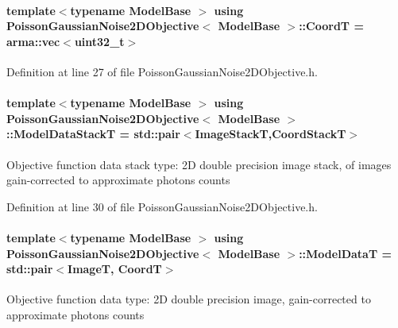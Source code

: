 \paragraph[{\texorpdfstring{CoordT}{CoordT}}]{\setlength{\rightskip}{0pt plus 5cm}template$<$typename Model\+Base $>$ using {\bf Poisson\+Gaussian\+Noise2\+D\+Objective}$<$ Model\+Base $>$\+::{\bf CoordT} =  arma\+::vec$<$uint32\+\_\+t$>$}\hypertarget{classPoissonGaussianNoise2DObjective_a4869a86fc5712492b479c26b4d808e38}{}\label{classPoissonGaussianNoise2DObjective_a4869a86fc5712492b479c26b4d808e38}


Definition at line 27 of file Poisson\+Gaussian\+Noise2\+D\+Objective.\+h.

\paragraph[{\texorpdfstring{Model\+Data\+StackT}{ModelDataStackT}}]{\setlength{\rightskip}{0pt plus 5cm}template$<$typename Model\+Base $>$ using {\bf Poisson\+Gaussian\+Noise2\+D\+Objective}$<$ Model\+Base $>$\+::{\bf Model\+Data\+StackT} =  std\+::pair$<$Image\+StackT,{\bf Coord\+StackT}$>$}\hypertarget{classPoissonGaussianNoise2DObjective_af88ce9c09fc860efefeba5569fbd5ac1}{}\label{classPoissonGaussianNoise2DObjective_af88ce9c09fc860efefeba5569fbd5ac1}
Objective function data stack type\+: 2D double precision image stack, of images gain-\/corrected to approximate photons counts 

Definition at line 30 of file Poisson\+Gaussian\+Noise2\+D\+Objective.\+h.

\paragraph[{\texorpdfstring{Model\+DataT}{ModelDataT}}]{\setlength{\rightskip}{0pt plus 5cm}template$<$typename Model\+Base $>$ using {\bf Poisson\+Gaussian\+Noise2\+D\+Objective}$<$ Model\+Base $>$\+::{\bf Model\+DataT} =  std\+::pair$<$ImageT, {\bf CoordT}$>$}\hypertarget{classPoissonGaussianNoise2DObjective_a9ee7fd979e5e5165304e224bff4d8754}{}\label{classPoissonGaussianNoise2DObjective_a9ee7fd979e5e5165304e224bff4d8754}
Objective function data type\+: 2D double precision image, gain-\/corrected to approximate photons counts 

